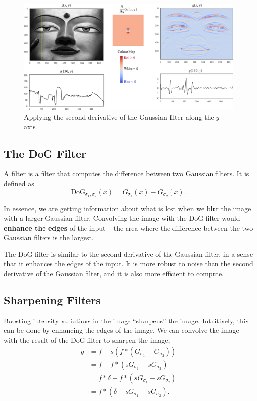 \begin{figure}[ht!]
    \centering
    \includegraphics[width=\linewidth]{figures/2nd-order-gaussian-derivative.jpg}
    \caption{Applying the second derivative of the Gaussian filter along the $y$-axis}
\end{figure}

\subsection{The DoG Filter}

A  filter is a filter that computes the difference between two Gaussian filters. It is defined as \[
    \text{DoG}_{\sigma_1, \sigma_2}(x) = G_{\sigma_1}(x) - G_{\sigma_2}(x).
\]

In essence, we are getting information about what is lost when we blur the image with a larger Gaussian filter. Convolving the image with the DoG filter would \textbf{enhance the edges} of the input -- the area where the difference between the two Gaussian filters is the largest.

The DoG filter is similar to the second derivative of the Gaussian filter, in a sense that it enhances the edges of the input. It is more robust to noise than the second derivative of the Gaussian filter, and it is also more efficient to compute.

\subsection{Sharpening Filters}

Boosting intensity variations in the image ``sharpens'' the image. Intuitively, this can be done by enhancing the edges of the image. We can convolve the image with the result of the DoG filter to sharpen the image, \begin{align*}
    g & = f + s \left( f \ast (G_{\sigma_1} - G_{\sigma_2}) \right)             \\
      & = f + f \ast \left( s G_{\sigma_1} - s G_{\sigma_2} \right)             \\
      & = f \ast \delta + f \ast \left( s G_{\sigma_1} - s G_{\sigma_2} \right) \\
      & = f \ast \left( \delta + s G_{\sigma_1} - s G_{\sigma_2} \right).
\end{align*}

